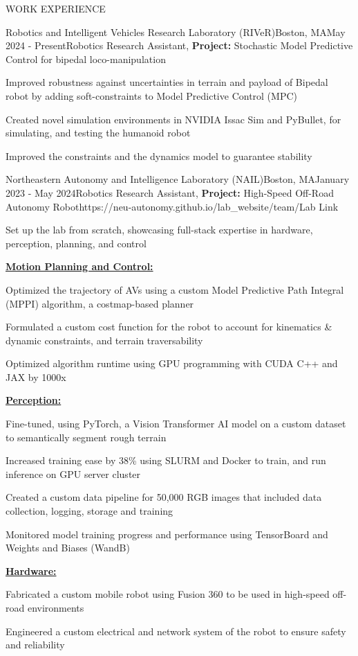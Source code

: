 \documentclass{resume} %
\begin{document}
\begin{rSection}{WORK EXPERIENCE}
	\begin{rProjExpDetails}{Robotics and Intelligent Vehicles Research Laboratory (RIVeR)}{Boston, MA}{May 2024 - Present}{Robotics Research Assistant, \textbf{Project:} Stochastic Model Predictive Control for bipedal loco-manipulation}{}{}
		\item Improved robustness against uncertainties in terrain and payload of Bipedal robot by adding soft-constraints to Model Predictive Control (MPC)
		\item Created novel simulation environments in NVIDIA Issac Sim and PyBullet, for simulating, and testing the humanoid robot
		\item Improved the constraints and the dynamics model to guarantee stability
	\end{rProjExpDetails}
	\begin{rProjExpDetails}{Northeastern Autonomy and Intelligence Laboratory (NAIL)}{Boston, MA}{January 2023 - May 2024}{Robotics Research Assistant, \textbf{Project:} High-Speed Off-Road Autonomy Robot}{https://neu-autonomy.github.io/lab_website/team/}{Lab Link}
		\item Set up the lab from scratch, showcasing full-stack expertise in hardware, perception, planning, and control
		\item[] \underline{\textbf{Motion Planning and Control:}}
		\item Optimized the trajectory of AVs using a custom Model Predictive Path Integral (MPPI) algorithm, a costmap-based planner
		\item Formulated a custom cost function for the robot to account for kinematics \& dynamic constraints, and terrain traversability
		\item Optimized algorithm runtime using GPU programming with CUDA C++ and JAX by 1000x
		\item[] \underline{\textbf{Perception:}}
		\item Fine-tuned, using PyTorch, a Vision Transformer AI model on a custom dataset to semantically segment rough terrain
		\item Increased training ease by 38\% using SLURM and Docker to train, and run inference on GPU server cluster
		\item Created a custom data pipeline for 50,000 RGB images that included data collection, logging, storage and training
		\item Monitored model training progress and performance using TensorBoard and Weights and Biases (WandB)
		\item[] \underline{\textbf{Hardware:}}
		\item Fabricated a custom mobile robot using Fusion 360 to be used in high-speed off-road environments
		\item Engineered a custom electrical and network system of the robot to ensure safety and reliability
	\end{rProjExpDetails}


\end{rSection}
\end{document}
